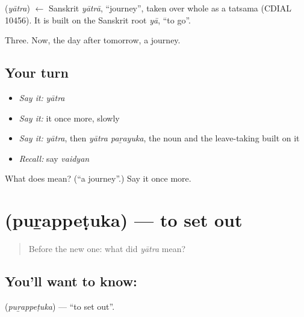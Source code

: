 \begin{cousinweb}
\textbf{} (\emph{yātra}) $\leftarrow$ Sanskrit \emph{yātrā}, \textquotedblleft{}journey\textquotedblright{}, taken over whole as a tatsama (CDIAL 10456). It is built on the Sanskrit root \emph{yā}, \textquotedblleft{}to go\textquotedblright{}.
\end{cousinweb}

\begin{grammarlens}[title={What you've built}]
Three. Now, the day after tomorrow, a journey.
\end{grammarlens}

\subsection*{Your turn}
\begin{itemize}
\raggedright
  \item \emph{Say it:} \emph{yātra}
  \item \emph{Say it:} it once more, slowly
  \item \emph{Say it:} \emph{yātra}, then \emph{yātra paṟayuka}, the noun and the leave-taking built on it
  \item \emph{Recall:} say \emph{vaidyan}
\end{itemize}

\begin{tcolorbox}[breakable,colback=teal!4,colframe=teal!35!black,title={Before you move on}]
What does  mean? (\textquotedblleft{}a journey\textquotedblright{}.) Say it once more.
\end{tcolorbox}
\section[\texorpdfstring{\ml{പുറപ്പെടുക} (puṟappeṭuka)}{പുറപ്പെടുക (puṟappeṭuka)}]{ (puṟappeṭuka) — to set out}

\label{lesson:ML-C50-set-out}



\begin{quote}
Before the new one: what did \emph{yātra} mean?
\end{quote}

\subsection*{You'll want to know: }
\textbf{} (\emph{puṟappeṭuka}) — \textquotedblleft{}to set out\textquotedblright{}.

